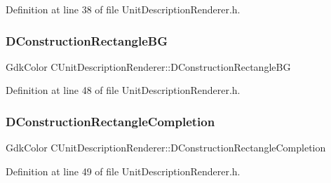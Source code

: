 Definition at line 38 of file Unit\+Description\+Renderer.\+h.

\hypertarget{classCUnitDescriptionRenderer_a7a763ac1aec2ee9d3b70694e1fbe4f9d}{}\label{classCUnitDescriptionRenderer_a7a763ac1aec2ee9d3b70694e1fbe4f9d} 
\subsubsection{\texorpdfstring{D\+Construction\+Rectangle\+BG}{DConstructionRectangleBG}}
{\footnotesize\ttfamily Gdk\+Color C\+Unit\+Description\+Renderer\+::\+D\+Construction\+Rectangle\+BG\hspace{0.3cm}{\ttfamily [protected]}}



Definition at line 48 of file Unit\+Description\+Renderer.\+h.

\hypertarget{classCUnitDescriptionRenderer_a6a512a78402b31fefb80794af96c1912}{}\label{classCUnitDescriptionRenderer_a6a512a78402b31fefb80794af96c1912} 
\subsubsection{\texorpdfstring{D\+Construction\+Rectangle\+Completion}{DConstructionRectangleCompletion}}
{\footnotesize\ttfamily Gdk\+Color C\+Unit\+Description\+Renderer\+::\+D\+Construction\+Rectangle\+Completion\hspace{0.3cm}{\ttfamily [protected]}}



Definition at line 49 of file Unit\+Description\+Renderer.\+h.

\hypertarget{classCUnitDescriptionRenderer_a2f4f541a008668f1b8fc55500443c1a3}{}\label{classCUnitDescriptionRenderer_a2f4f541a008668f1b8fc55500443c1a3} 

